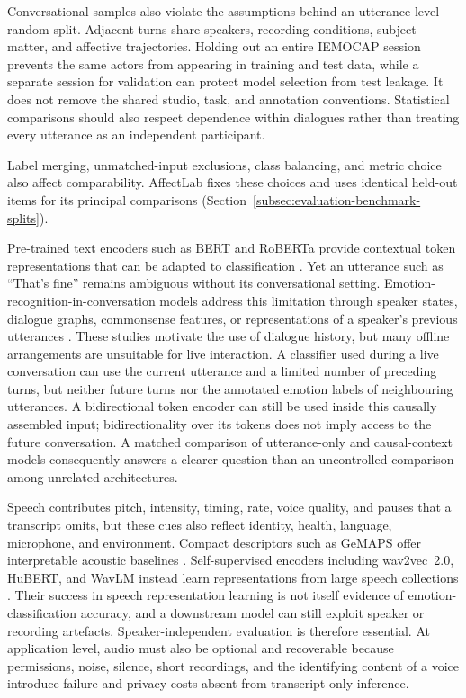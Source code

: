 Conversational samples also violate the assumptions behind an utterance-level random split. Adjacent turns share speakers, recording conditions, subject matter, and affective trajectories. Holding out an entire IEMOCAP session prevents the same actors from appearing in training and test data, while a separate session for validation can protect model selection from test leakage. It does not remove the shared studio, task, and annotation conventions. Statistical comparisons should also respect dependence within dialogues rather than treating every utterance as an independent participant.

Label merging, unmatched-input exclusions, class balancing, and metric choice also affect comparability. AffectLab fixes these choices and uses identical held-out items for its principal comparisons (Section~\ref{subsec:evaluation-benchmark-splits}).

Pre-trained text encoders such as BERT and RoBERTa provide contextual token representations that can be adapted to classification \cite{devlin2019bert,liu2019roberta}. Yet an utterance such as ``That's fine'' remains ambiguous without its conversational setting. Emotion-recognition-in-conversation models address this limitation through speaker states, dialogue graphs, commonsense features, or representations of a speaker's previous utterances \cite{majumder2019dialoguernn,ghosal2019dialoguegcn,ghosal2020cosmic,lee2022compm}. These studies motivate the use of dialogue history, but many offline arrangements are unsuitable for live interaction. A classifier used during a live conversation can use the current utterance and a limited number of preceding turns, but neither future turns nor the annotated emotion labels of neighbouring utterances. A bidirectional token encoder can still be used inside this causally assembled input; bidirectionality over its tokens does not imply access to the future conversation. A matched comparison of utterance-only and causal-context models consequently answers a clearer question than an uncontrolled comparison among unrelated architectures.

Speech contributes pitch, intensity, timing, rate, voice quality, and pauses that a transcript omits, but these cues also reflect identity, health, language, microphone, and environment. Compact descriptors such as GeMAPS offer interpretable acoustic baselines \cite{eyben2016gemaps}. Self-supervised encoders including wav2vec~2.0, HuBERT, and WavLM instead learn representations from large speech collections \cite{baevski2020wav2vec,hsu2021hubert,chen2022wavlm}. Their success in speech representation learning is not itself evidence of emotion-classification accuracy, and a downstream model can still exploit speaker or recording artefacts. Speaker-independent evaluation is therefore essential. At application level, audio must also be optional and recoverable because permissions, noise, silence, short recordings, and the identifying content of a voice introduce failure and privacy costs absent from transcript-only inference.

